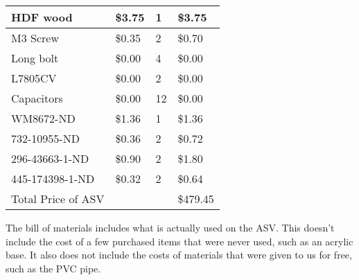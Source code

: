 \begin{table}[H]
\begin{tabular}{|l|l|l|l|}
        HDF wood & \$3.75 & 1 & \$3.75 \\ \hline
        M3 Screw & \$0.35 & 2 & \$0.70 \\ \hline
        Long bolt  & \$0.00 & 4 & \$0.00 \\ \hline
        L7805CV & \$0.00 & 2 & \$0.00 \\ \hline
        Capacitors & \$0.00 & 12 & \$0.00 \\ \hline
        WM8672-ND & \$1.36 & 1 & \$1.36 \\ \hline
        732-10955-ND & \$0.36 & 2 & \$0.72 \\ \hline
        296-43663-1-ND & \$0.90 & 2 & \$1.80 \\ \hline
        445-174398-1-ND & \$0.32 & 2 & \$0.64 \\ \hline
        Total Price of ASV & ~ & ~ & \$479.45 \\ \hline
    \end{tabular}
\end{table}

The bill of materials includes what is actually used on the ASV. This doesn't include the cost of a few purchased items that were never used, such as an acrylic base. It also does not include the costs of materials that were given to us for free, such as the PVC pipe.